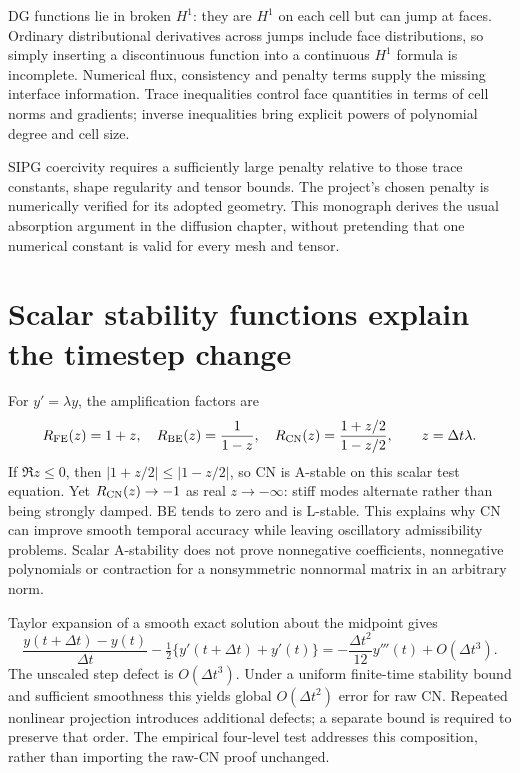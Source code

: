 DG functions lie in broken $H^1$: they are $H^1$ on each cell but can jump at faces. Ordinary distributional derivatives across jumps include face distributions, so simply inserting a discontinuous function into a continuous $H^1$ formula is incomplete. Numerical flux, consistency and penalty terms supply the missing interface information. Trace inequalities control face quantities in terms of cell norms and gradients; inverse inequalities bring explicit powers of polynomial degree and cell size.

SIPG coercivity requires a sufficiently large penalty relative to those trace constants, shape regularity and tensor bounds. The project's chosen penalty is numerically verified for its adopted geometry. This monograph derives the usual absorption argument in the diffusion chapter, without pretending that one numerical constant is valid for every mesh and tensor.

\section{Scalar stability functions explain the timestep change}
For $y'=\lambda y$, the amplification factors are
\begin{equation}
 R_{\rm FE}(z)=1+z,\quad R_{\rm BE}(z)=\frac1{1-z},\quad
 R_{\rm CN}(z)=\frac{1+z/2}{1-z/2},\qquad z=\Delta t\lambda.
\end{equation}
If $\Re z\le0$, then $|1+z/2|\le|1-z/2|$, so CN is A-stable on this scalar test equation. Yet $R_{\rm CN}(z)\to-1$ as real $z\to-\infty$: stiff modes alternate rather than being strongly damped. BE tends to zero and is L-stable. This explains why CN can improve smooth temporal accuracy while leaving oscillatory admissibility problems. Scalar A-stability does not prove nonnegative coefficients, nonnegative polynomials or contraction for a nonsymmetric nonnormal matrix in an arbitrary norm.

Taylor expansion of a smooth exact solution about the midpoint gives
\begin{equation}
 \frac{y(t+\Delta t)-y(t)}{\Delta t}
 -\tfrac12\{y'(t+\Delta t)+y'(t)\}
 =-\frac{\Delta t^2}{12}y'''(t)+O(\Delta t^3).
\end{equation}
The unscaled step defect is $O(\Delta t^3)$. Under a uniform finite-time stability bound and sufficient smoothness this yields global $O(\Delta t^2)$ error for raw CN. Repeated nonlinear projection introduces additional defects; a separate bound is required to preserve that order. The empirical four-level test addresses this composition, rather than importing the raw-CN proof unchanged.

